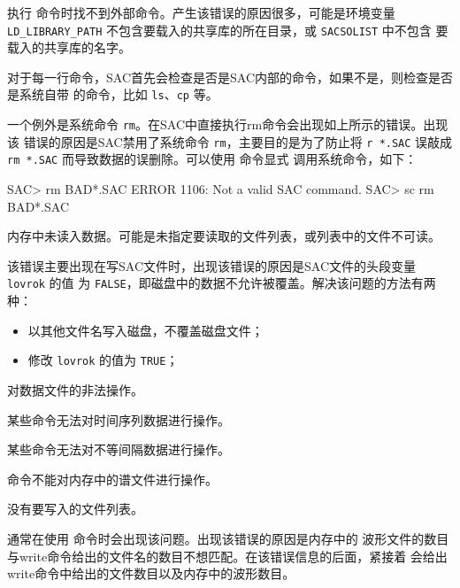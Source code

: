 执行  命令时找不到外部命令。产生该错误的原因很多，可能是环境变量
\verb|LD_LIBRARY_PATH| 不包含要载入的共享库的所在目录，或 \texttt{SACSOLIST} 中不包含
要载入的共享库的名字。

对于每一行命令，SAC首先会检查是否是SAC内部的命令，如果不是，则检查是否是系统自带
的命令，比如 \texttt{ls}、\texttt{cp} 等。

一个例外是系统命令 \texttt{rm}。在SAC中直接执行rm命令会出现如上所示的错误。出现该
错误的原因是SAC禁用了系统命令 \texttt{rm}，主要目的是为了防止将 \texttt{r *.SAC} 误敲成
\texttt{rm *.SAC} 而导致数据的误删除。可以使用  命令显式
调用系统命令，如下：
\begin{SACCode}
SAC> rm BAD*.SAC
 ERROR 1106: Not a valid SAC command.
SAC> sc rm BAD*.SAC
\end{SACCode}

内存中未读入数据。可能是未指定要读取的文件列表，或列表中的文件不可读。

该错误主要出现在写SAC文件时，出现该错误的原因是SAC文件的头段变量 \texttt{lovrok} 的值
为 \texttt{FALSE}，即磁盘中的数据不允许被覆盖。解决该问题的方法有两种：
\begin{itemize}
\item 以其他文件名写入磁盘，不覆盖磁盘文件；
\item 修改 \texttt{lovrok} 的值为 \texttt{TRUE}；
\end{itemize}

对数据文件的非法操作。

某些命令无法对时间序列数据进行操作。

某些命令无法对不等间隔数据进行操作。

命令不能对内存中的谱文件进行操作。

没有要写入的文件列表。

通常在使用  命令时会出现该问题。出现该错误的原因是内存中的
波形文件的数目与write命令给出的文件名的数目不想匹配。在该错误信息的后面，紧接着
会给出write命令中给出的文件数目以及内存中的波形数目。

